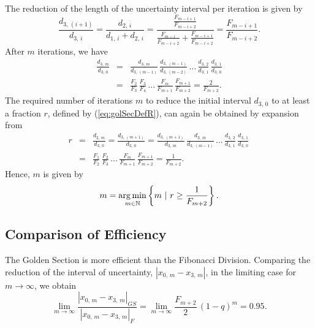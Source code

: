 The reduction of the length of the uncertainty interval per iteration is given by
\begin{equation}
  \frac{ d_{3, \, (i+1)} }{  d_{3, \, i}  } =
  \frac{ d_{2, \, i} }{  d_{1, \, i} + d_{2, \, i}  } = 
   \frac{  \frac{ F_{m-i+1} }{F_{m-i+2}}  }
     {  \frac{F_{m-i}}{F_{m-i+2}} +  \frac{F_{m-i+1}}{F_{m-i+2}}   } = 
        \frac{ F_{m-i+1}   }{ F_{m-i+2}   }.
\end{equation}
After $m$ iterations, we have
\begin{eqnarray}
  \frac{d_{3, \, m}}{d_{3, \, 0}} & = & 
  \frac{ d_{ 3, \, m}  }{ d_{ 3, \, (m-1)}  } \, 
  \frac{ d_{ 3, \, (m-1)}  }{ d_{ 3, \, (m-2)}  } \,
   \ldots \,
   \frac{ d_{ 3, \, 2}  }{ d_{ 3, \, 1}  } \,
   \frac{ d_{ 3, \, 1}  }{ d_{ 3, \, 0}  } \nonumber \\
 & = &
  \frac{F_{2} }{ F_{3} } \, 
  \frac{F_{3} }{ F_{4} } \, \ldots \, 
  \frac{F_{m} }{ F_{m+1} } \, 
  \frac{F_{m+1} }{ F_{m+2} } 
=
  \frac{2}{F_{m+2}}.
\end{eqnarray}
The required number of iterations $m$ to reduce the initial interval $d_{3, \, 0}$ 
to at least a fraction $r$, defined by (\ref{eq:golSecDefR}), can again be obtained by expansion from
\begin{eqnarray}
  r & = & 
  \frac{d_{2, \, m}}{d_{3, \, 0}} = 
  \frac{ d_{ 3, \, (m+1)}  }{ d_{ 3, \, 0}  } = 
  \frac{ d_{ 3, \, (m+1)}  }{ d_{ 3, \, m}  } \,
  \frac{ d_{ 3, \, m}  }{ d_{ 3, \, (m-1)}  } \,
   \ldots \,
   \frac{ d_{ 3, \, 2}  }{ d_{ 3, \, 1}  } \,
   \frac{ d_{ 3, \, 1}  }{ d_{ 3, \, 0}  } \, \nonumber \\
 & = &
  \frac{F_{1} }{ F_{2} } \, 
  \frac{F_{2} }{ F_{3} } \, \ldots \, 
  \frac{F_{m} }{ F_{m+1} } \, 
  \frac{F_{m+1} }{ F_{m+2} } 
=
  \frac{1}{F_{m+2}}.
\end{eqnarray}
Hence, $m$ is given by
\begin{equation}
  m = \mathop{\arg \min}_{m \in {\mathbb N}} \left\{ m \ | \ r \ge \frac{1}{F_{m+2}} \right\}.
\end{equation}


\subsection{Comparison of Efficiency}
The Golden Section is more efficient than the Fibonacci Division. Comparing the reduction of the interval of uncertainty, $| x_{0, \, m} - x_{3, \, m}|$, in the limiting case for $m \rightarrow \infty$, we obtain
\begin{equation}
   \lim_{m \rightarrow \infty} \frac{ | x_{0, \, m} - x_{3, \, m}  |_{GS} }
  { | x_{0, \, m} - x_{3, \, m}  |_{F} }
= \lim_{m \rightarrow \infty} \frac{F_{m+2}}{2} \, (1-q)^m = 0.95.
\end{equation}

